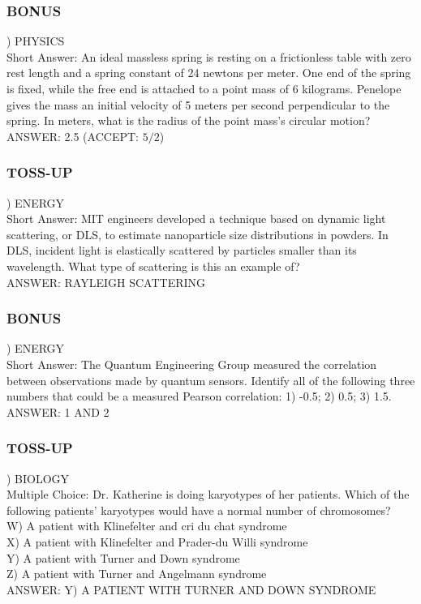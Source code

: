 \documentclass{article}
\begin{document}
\subsubsection*{BONUS}
) PHYSICS \\
Short Answer: An ideal massless spring is resting on a frictionless table with zero rest length and a spring constant of 24 newtons per meter. One end of the spring is fixed, while the free end is attached to a point mass of 6 kilograms. Penelope gives the mass an initial velocity of 5 meters per second perpendicular to the spring. In meters, what is the radius of the point mass's circular motion? \\
ANSWER: 2.5 (ACCEPT: $5/2$)

\newpage

\subsubsection*{TOSS-UP}
) ENERGY \\
Short Answer: MIT engineers developed a technique based on dynamic light scattering, or DLS, to estimate nanoparticle size distributions in powders. In DLS, incident light is elastically scattered by particles smaller than its wavelength. What type of scattering is this an example of? \\
ANSWER: RAYLEIGH SCATTERING

\subsubsection*{BONUS}
) ENERGY \\
Short Answer: The Quantum Engineering Group measured the correlation between observations made by quantum sensors. Identify all of the following three numbers that could be a measured Pearson correlation: 1) -0.5; 2) 0.5; 3) 1.5. \\
ANSWER: 1 AND 2

\subsubsection*{TOSS-UP}
) BIOLOGY \\
Multiple Choice: Dr. Katherine is doing karyotypes of her patients. Which of the following patients' karyotypes would have a normal number of chromosomes? \\
W) A patient with Klinefelter and cri du chat syndrome \\
X) A patient with Klinefelter and Prader-du Willi syndrome \\
Y) A patient with Turner and Down syndrome \\
Z) A patient with Turner and Angelmann syndrome \\
ANSWER: Y) A PATIENT WITH TURNER AND DOWN SYNDROME
\end{document}
